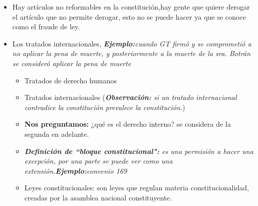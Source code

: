 \begin{etaremune}
\begin{itemize}
        \item Hay artículos no reformables en la constitución,hay gente que quiere derogar el artículo que no permite derogar, esto no se puede hacer ya que se conoce como el fraude de ley.
        \item Los tratados internacionales, \emph{\textbf{Ejemplo:}cuando GT firmó y se comprometió a no aplicar la pena de muerte, y posteriormente a la muerte de la sra. Botrán se consideró aplicar la pena de muerte}
            \begin{itemize}
                \item Tratados de derecho humanos
                \item Tratados internacionales (\emph{\textbf{Observación: }si un tratado internacional contradice la constitución prevalece la constitución.})
                \item  \textbf{Nos preguntamos:} ¿qué es el derecho interno? se considera de la segunda en adelante. 
                \item \emph{\textbf{Definición de ``bloque constitucional":} es una permisión a hacer una excepción, por una parte se puede ver como una extensión.\emph{\textbf{Ejemplo:}convenio 169}}
                \item Leyes constitucionales: son leyes que regulan materia constitucionalidad, creadas por la asamblea nacional constituyente. 
            \end{itemize}
    \end{itemize}
\end{etaremune}



